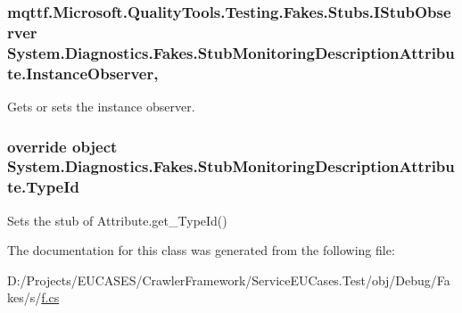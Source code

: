 \hypertarget{class_system_1_1_diagnostics_1_1_fakes_1_1_stub_monitoring_description_attribute_a62856389f2f64c4bf6926281f200f54d}{
\subsubsection[{Instance\-Observer}]{\setlength{\rightskip}{0pt plus 5cm}mqttf.\-Microsoft.\-Quality\-Tools.\-Testing.\-Fakes.\-Stubs.\-I\-Stub\-Observer System.\-Diagnostics.\-Fakes.\-Stub\-Monitoring\-Description\-Attribute.\-Instance\-Observer\hspace{0.3cm}{\ttfamily [get]}, {\ttfamily [set]}}}\label{class_system_1_1_diagnostics_1_1_fakes_1_1_stub_monitoring_description_attribute_a62856389f2f64c4bf6926281f200f54d}


Gets or sets the instance observer.

\hypertarget{class_system_1_1_diagnostics_1_1_fakes_1_1_stub_monitoring_description_attribute_a44d0cf97170c95020e259a71883163cb}{
\subsubsection[{Type\-Id}]{\setlength{\rightskip}{0pt plus 5cm}override object System.\-Diagnostics.\-Fakes.\-Stub\-Monitoring\-Description\-Attribute.\-Type\-Id\hspace{0.3cm}{\ttfamily [get]}}}\label{class_system_1_1_diagnostics_1_1_fakes_1_1_stub_monitoring_description_attribute_a44d0cf97170c95020e259a71883163cb}


Sets the stub of Attribute.\-get\-\_\-\-Type\-Id()



The documentation for this class was generated from the following file\-:\begin{DoxyCompactItemize}
\item 
D\-:/\-Projects/\-E\-U\-C\-A\-S\-E\-S/\-Crawler\-Framework/\-Service\-E\-U\-Cases.\-Test/obj/\-Debug/\-Fakes/s/\hyperlink{s_2f_8cs}{f.\-cs}\end{DoxyCompactItemize}

